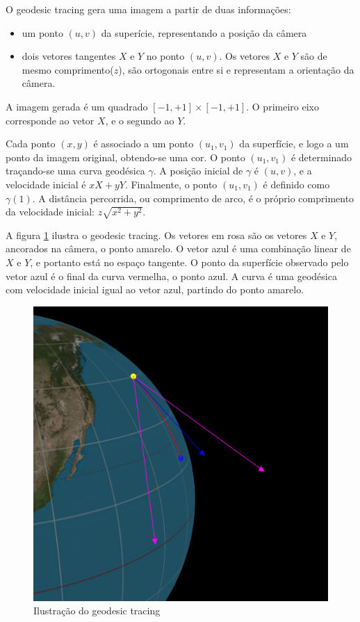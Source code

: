 O geodesic tracing gera uma imagem a partir de duas informações:
\begin{itemize}
    \item um ponto $(u,v)$ da superície, representando a posição da câmera
    \item dois vetores tangentes $X$ e $Y$ no ponto $(u,v)$.
    Os vetores $X$ e $Y$ são de mesmo comprimento($z$), são ortogonais entre si e
    representam a orientação da câmera.
\end{itemize}

A imagem gerada é um quadrado $[-1, +1] \times [-1, +1]$.
O primeiro eixo corresponde ao vetor $X$, e o segundo ao $Y$.

Cada ponto $(x,y)$ é associado a um ponto $(u_1, v_1)$ da superfície,
e logo a um ponto da imagem original, obtendo-se uma cor.
O ponto $(u_1, v_1)$ é determinado traçando-se uma curva geodésica $\gamma$.
A posição inicial de $\gamma$ é $(u,v)$, e a velocidade inicial é $xX+yY$.
Finalmente, o ponto $(u_1, v_1)$ é definido como $\gamma(1)$.
A distância percorrida, ou comprimento de arco, é o próprio comprimento
da velocidade inicial: $z\sqrt{x^2+y^2}$.

A figura \ref{img:geotracing} ilustra o geodesic tracing.
Os vetores em rosa são os vetores $X$ e $Y$, ancorados na câmera, o ponto amarelo.
O vetor azul é uma combinação linear de $X$ e $Y$, e portanto está no espaço tangente.
O ponto da superfície observado pelo vetor azul é o final da curva vermelha, o ponto azul.
A curva é uma geodésica com velocidade inicial igual ao vetor azul, partindo do ponto amarelo.

\begin{figure}[!ht]
    \includegraphics[width=\linewidth]{geotracing.png}
    \caption{Ilustração do geodesic tracing}
    \label{img:geotracing}
\end{figure}

